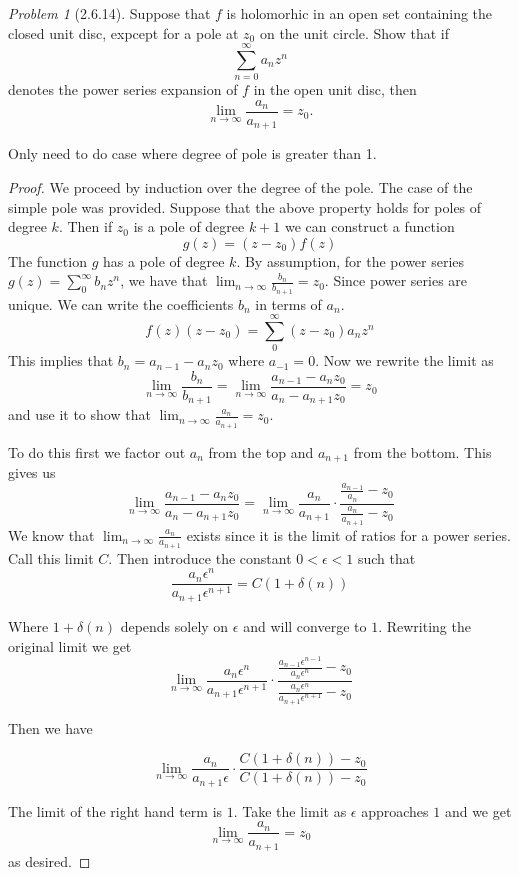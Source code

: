 \documentclass[10pt]{article}
\theoremstyle{remark}
\newtheorem{problem}{Problem}
\theoremstyle{remark}
\begin{document}
\begin{problem}[2.6.14]
  Suppose that $f$ is holomorhic in an open set containing the closed unit disc,
  expcept for a pole at $z_0$ on the unit circle. Show that if
  \[
    \sum_{n=0}^\infty a_n z^n
  \]
  denotes the power series expansion of $f$ in the open unit disc, then
  \[
    \lim_{n\rightarrow\infty}\frac{a_n}{a_{n+1}}=z_0.
  \]
  
  Only need to do case where degree of pole is greater than 1.
\end{problem}

\begin{proof}
  We proceed by induction over the degree of the pole. The case of the simple
  pole was provided. Suppose that the above property holds for poles of
  degree $k$. Then if $z_0$ is a pole of degree $k+1$ we can construct a function
  \[
    g(z)=(z-z_0)f(z)
  \]
  The function $g$ has a pole of degree $k$. By assumption, for the power series
  $g(z)=\sum_0^\infty b_nz^n$, we have that $\lim_{n\rightarrow\infty}\frac{b_n}{b_{n+1}}=z_0$. Since
  power series are unique. We can write the coefficients $b_n$ in terms of $a_n$.
  \[
    f(z)(z-z_0)=\sum_0^\infty(z-z_0)a_nz^n
  \]
  This implies that $b_n=a_{n-1}-a_nz_0$ where $a_{-1}=0$. Now we rewrite the limit
  as
  \[
    \lim_{n\rightarrow\infty}\frac{b_n}{b_{n+1}}=\lim_{n\rightarrow\infty}\frac{a_{n-1}-a_nz_0}{a_n-a_{n+1}z_0}=z_0
  \]
  and use it to show that $\lim_{n\rightarrow\infty}\frac{a_n}{a_{n+1}}=z_0$.

  To do this first we factor out $a_n$ from the top and $a_{n+1}$ from the bottom. This
  gives us
  \[
    \lim_{n\rightarrow\infty}\frac{a_{n-1}-a_nz_0}{a_n-a_{n+1}z_0}=\lim_{n\rightarrow\infty}\frac{a_n}{a_{n+1}}\cdot\frac{\frac{a_{n-1}}{a_n}-z_0}{\frac{a_n}{a_{n+1}}-z_0}
  \]
  We know that $\lim_{n\rightarrow\infty}\frac{a_n}{a_{n+1}}$ exists since it is
  the limit of ratios for a power series. Call this limit $C$. Then introduce the constant $0<\epsilon<1$
  such that
  \[
    \frac{a_n\epsilon^n}{a_{n+1}\epsilon^{n+1}}=C(1+\delta(n))
  \]

  Where $1+\delta(n)$ depends solely on $\epsilon$ and will converge to $1$. Rewriting the original limit we get
  \[
    \lim_{n\rightarrow\infty}\frac{a_n\epsilon^n}{a_{n+1}\epsilon^{n+1}}\cdot\frac{\frac{a_{n-1}\epsilon^{n-1}}{a_n\epsilon^{n}}-z_0}{\frac{a_n\epsilon^{n}}{a_{n+1}\epsilon^{n+1}}-z_0}
  \]

  Then we have

  \[
    \lim_{n\rightarrow\infty}\frac{a_n}{a_{n+1}\epsilon}\cdot\frac{C(1+\delta(n))-z_0}{C(1+\delta(n))-z_0}
  \]

  The limit of the right hand term is $1$. Take the limit as $\epsilon$ approaches $1$ and we
  get
  \[
    \lim_{n\rightarrow\infty}\frac{a_n}{a_{n+1}}=z_0
  \]
  as desired.
\end{proof}
\end{document}
